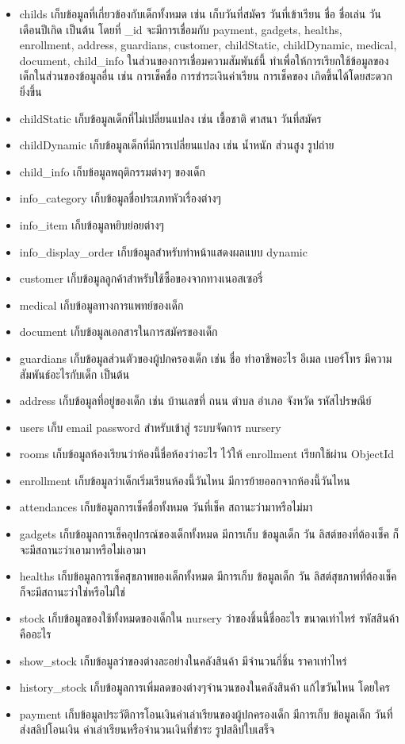   \begin{itemize}
    \item childs เก็บข้อมูลที่เกี่ยวข้องกับเด็กทั้งหมด เช่น เก็บวันที่สมัคร วันที่เข้าเรียน ชื่อ ชื่อเล่น วันเดือนปีเกิด เป็นต้น  
    โดยที่ \_id จะมีการเชื่อมกับ payment, gadgets, healths, enrollment, address, guardians, customer, childStatic, childDynamic, medical, document, child\_info 
    ในส่วนของการเชื่อมความสัมพันธ์นี้ ทำเพื่อให้การเรียกใช้ข้อมูลของเด็กในส่วนของข้อมูลอื่น เช่น การเช็คชื่อ การชำระเงินค่าเรียน การเช็คของ เกิดขึ้นได้โดยสะดวกยิ่งขึ้น
    \item childStatic เก็บข้อมูลเด็กที่ไม่เปลี่ยนแปลง เช่น เชื้อชาติ ศาสนา วันที่สมัคร
    \item childDynamic เก็บข้อมูลเด็กที่มีการเปลี่ยนแปลง เช่น น้ำหนัก ส่วนสูง รูปถ่าย
    \item child\_info เก็บข้อมูลพฤติกรรมต่างๆ ของเด็ก
    \item info\_category เก็บข้อมูลชื่อประเภทหัวเรื่องต่างๆ
    \item info\_item เก็บข้อมูลหยิบย่อยต่างๆ
    \item info\_display\_order เก็บข้อมูลสำหรับทำหน้าแสดงผลแบบ dynamic
    \item customer เก็บข้อมูลลูกค้าสำหรับใช้ซื้อของจากทางเนอสเซอรี่
    \item medical เก็บข้อมูลทางการแพทย์ของเด็ก
    \item document เก็บข้อมูลเอกสารในการสมัครของเด็ก
    \item guardians เก็บข้อมูลส่วนตัวของผู้ปกครองเด็ก เช่น ชื่อ ทำอาชีพอะไร อีเมล เบอร์โทร มีความสัมพันธ์อะไรกับเด็ก เป็นต้น
    \item address เก็บข้อมูลที่อยู่ของเด็ก เช่น บ้านเลขที่ ถนน ตำบล อำเภอ จังหวัด รหัสไปรษณีย์ 
    \item users เก็บ email password สำหรับเข้าสู่ ระบบจัดการ nursery 
    \item rooms เก็บข้อมูลห้องเรียนว่าห้องนี้ชื่อห้องว่าอะไร ไว้ให้ enrollment เรียกใช้ผ่าน ObjectId
    \item enrollment เก็บข้อมูลว่าเด็กเริ่มเรียนห้องนี้วันไหน มีการย้ายออกจากห้องนี้วันไหน
    \item attendances เก็บข้อมูลการเช็คชื่อทั้งหมด วันที่เช็ค สถานะว่ามาหรือไม่มา
    \item gadgets เก็บข้อมูลการเช็คอุปกรณ์ของเด็กทั้งหมด มีการเก็บ ข้อมูลเด็ก วัน ลิสต์ของที่ต้องเช็ค ก็จะมีสถานะว่าเอามาหรือไม่เอามา
    \item healths เก็บข้อมูลการเช็คสุขภาพของเด็กทั้งหมด มีการเก็บ ข้อมูลเด็ก วัน ลิสต์สุขภาพที่ต้องเช็ค ก็จะมีสถานะว่าใช่หรือไม่ใช่
    \item stock เก็บข้อมูลของใช้ทั้งหมดของเด็กใน nursery ว่าของชิ้นนี้ชื่ออะไร ขนาดเท่าไหร่ รหัสสินค้าคืออะไร
    \item show\_stock เก็บข้อมูลว่าของต่างละอย่างในคลังสินค้า มีจำนวนกี่ชิ้น ราคาเท่าไหร่
    \item history\_stock เก็บข้อมูลการเพิ่มลดของต่างๆจำนวนของในคลังสินค้า แก้ไขวันไหน โดยใคร
    \item payment เก็บข้อมูลประวัติการโอนเงินค่าเล่าเรียนของผู้ปกครองเด็ก มีการเก็บ ข้อมูลเด็ก วันที่ส่งสลิปโอนเงิน ค่าเล่าเรียนหรือจำนวนเงินที่ชำระ รูปสลิปใบเสร็จ 
  \end{itemize}
